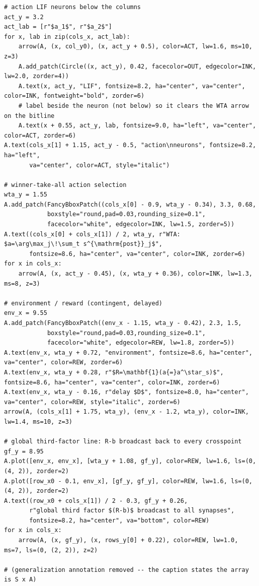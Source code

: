 \begin{lstlisting}[caption={schematics.ipynb code cell 7},label={lst:mrl-nb-schematics-7}]
# action LIF neurons below the columns
act_y = 3.2
act_lab = [r"$a_1$", r"$a_2$"]
for x, lab in zip(cols_x, act_lab):
    arrow(A, (x, col_y0), (x, act_y + 0.5), color=ACT, lw=1.6, ms=10, z=3)
    A.add_patch(Circle((x, act_y), 0.42, facecolor=OUT, edgecolor=INK, lw=2.0, zorder=4))
    A.text(x, act_y, "LIF", fontsize=8.2, ha="center", va="center", color=INK, fontweight="bold", zorder=6)
    # label beside the neuron (not below) so it clears the WTA arrow on the bitline
    A.text(x + 0.55, act_y, lab, fontsize=9.0, ha="left", va="center", color=ACT, zorder=6)
A.text(cols_x[1] + 1.15, act_y - 0.5, "action\nneurons", fontsize=8.2, ha="left",
       va="center", color=ACT, style="italic")

# winner-take-all action selection
wta_y = 1.55
A.add_patch(FancyBboxPatch((cols_x[0] - 0.9, wta_y - 0.34), 3.3, 0.68,
            boxstyle="round,pad=0.03,rounding_size=0.1",
            facecolor="white", edgecolor=INK, lw=1.5, zorder=5))
A.text((cols_x[0] + cols_x[1]) / 2, wta_y, r"WTA: $a=\arg\max_j\!\sum_t s^{\mathrm{post}}_j$",
       fontsize=8.6, ha="center", va="center", color=INK, zorder=6)
for x in cols_x:
    arrow(A, (x, act_y - 0.45), (x, wta_y + 0.36), color=INK, lw=1.3, ms=8, z=3)

# environment / reward (contingent, delayed)
env_x = 9.55
A.add_patch(FancyBboxPatch((env_x - 1.15, wta_y - 0.42), 2.3, 1.5,
            boxstyle="round,pad=0.03,rounding_size=0.1",
            facecolor="white", edgecolor=REW, lw=1.8, zorder=5))
A.text(env_x, wta_y + 0.72, "environment", fontsize=8.6, ha="center", va="center", color=REW, zorder=6)
A.text(env_x, wta_y + 0.28, r"$R=\mathbf{1}(a{=}a^\star_s)$", fontsize=8.6, ha="center", va="center", color=INK, zorder=6)
A.text(env_x, wta_y - 0.16, r"delay $D$", fontsize=8.0, ha="center", va="center", color=REW, style="italic", zorder=6)
arrow(A, (cols_x[1] + 1.75, wta_y), (env_x - 1.2, wta_y), color=INK, lw=1.4, ms=10, z=3)

# global third-factor line: R-b broadcast back to every crosspoint
gf_y = 8.95
A.plot([env_x, env_x], [wta_y + 1.08, gf_y], color=REW, lw=1.6, ls=(0, (4, 2)), zorder=2)
A.plot([row_x0 - 0.1, env_x], [gf_y, gf_y], color=REW, lw=1.6, ls=(0, (4, 2)), zorder=2)
A.text((row_x0 + cols_x[1]) / 2 - 0.3, gf_y + 0.26,
       r"global third factor $(R-b)$ broadcast to all synapses",
       fontsize=8.2, ha="center", va="bottom", color=REW)
for x in cols_x:
    arrow(A, (x, gf_y), (x, rows_y[0] + 0.22), color=REW, lw=1.0, ms=7, ls=(0, (2, 2)), z=2)

# (generalization annotation removed -- the caption states the array is S x A)


\end{lstlisting}
